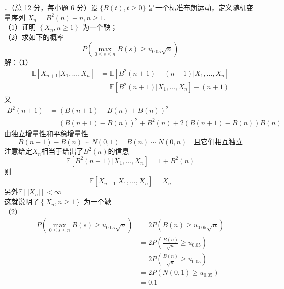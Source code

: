 \documentclass[UTF8]{ctexart}
\begin{document}
．（总 12 分，每小题 6 分）设 $\{B(t), t \geq 0\}$ 是一个标准布朗运动，定义随机变量序列 $X_{n}=B^{2}(n)-n, n \geq 1$.\\
（1）证明 $\left\{X_{n}, n \geq 1\right\}$ 为一个鞅；\\
（2）求如下的概率
$$
P\left(\max _{0 \leq s \leq n} B(s) \geq u_{0.05} \sqrt{n}\right)
$$
解：（1）\\
$$
\begin{aligned}
	\mathbb{E}\left[X_{n+1}|X_1,...,X_n \right]&=\mathbb{E}\left[B^2(n+1)-(n+1)|X_1,...,X_n \right]  \\
	&=\mathbb{E}\left[B^2(n+1)|X_1,...,X_n \right]-(n+1)
\end{aligned}
$$
又
$$
\begin{aligned}
	B^2(n+1)&=\left(B(n+1)-B(n)+B(n) \right)^2\\
	&=\left(B(n+1)-B(n) \right)^2+B^2(n)+2 \left(B(n+1)-B(n) \right)B(n)
\end{aligned}
$$
由独立增量性和平稳增量性
\[
B(n+1)-B(n)\sim N(0,1) \quad B(n)\sim N(0,n)\quad \text{且它们相互独立} 
\]
注意给定$X_n$相当于给出了$B^2(n)$的信息
\[
\mathbb{E}\left[B^2(n+1)|X_1,...,X_n \right]=1+B^2(n)
\]
则
\[
\mathbb{E}\left[X_{n+1}|X_1,...,X_n \right]=X_n
\]
另外$\mathbb{E}[|X_n|]<\infty$\\
这就说明了$\left\{X_{n}, n \geq 1\right\}$ 为一个鞅\\
（2）\\
$$
\begin{aligned}
	P\left(\max _{0 \leq s \leq n} B(s) \geq u_{0.05} \sqrt{n}\right)&=2P\left(B(n)\ge u_{0.05} \sqrt{n} \right)\\
	&=2P\left(\frac{B(n)}{\sqrt{n}}\ge u_{0.05} \right)\\
	&=2P\left(\frac{B(n)}{\sqrt{n}}\ge u_{0.05} \right)\\
	&=  2P\left(N(0,1)\ge u_{0.05} \right)\\
	&= 0.1   
\end{aligned}
$$
\end{document}
